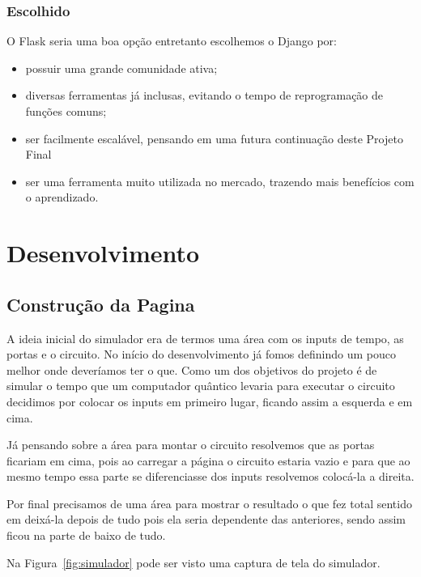 \documentclass[a4paper, 12pt, oneside]{book}
\begin{document}
\subsection{Escolhido}
O Flask seria uma boa opção entretanto escolhemos o Django por:
\begin{itemize}
\item possuir uma grande comunidade ativa;
\item diversas ferramentas já inclusas, evitando o tempo de reprogramação de funções comuns;
\item ser facilmente escalável, pensando em uma futura continuação deste Projeto Final
\item ser uma ferramenta muito utilizada no mercado, trazendo mais benefícios com o aprendizado.
\end{itemize}


\chapter{Desenvolvimento}
\thispagestyle{empty} 

\section{Construção da Pagina}
A ideia inicial do simulador era de termos uma área com os inputs de tempo, as portas e o circuito. No início do desenvolvimento já fomos definindo um pouco melhor onde deveríamos ter o que. Como um dos objetivos do projeto é de simular o tempo que um computador quântico levaria para executar o circuito decidimos por colocar os inputs em primeiro lugar, ficando assim a esquerda e em cima. 

Já pensando sobre a área para montar o circuito resolvemos que as portas ficariam em cima, pois ao carregar a página o circuito estaria vazio e para que ao mesmo tempo essa parte se diferenciasse dos inputs resolvemos colocá-la a direita.

Por final precisamos de uma área para mostrar o resultado o que fez total sentido em deixá-la depois de tudo pois ela seria dependente das anteriores, sendo assim ficou na parte de baixo de tudo.

Na Figura~\ref{fig:simulador} pode ser visto uma captura de tela do simulador.
\end{document}
